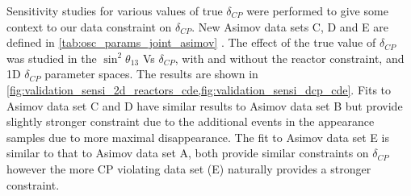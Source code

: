 \clearpage

Sensitivity studies for various values of true $\delta_{CP}$ were performed to give some context to our data constraint on $\delta_{CP}$. New Asimov data sets C, D and E are defined in \cref{tab:osc_params_joint_asimov} .
The effect of the true value of $\delta_{CP}$ was studied in the $\sin^2 \theta_{13}$ Vs $\delta_{CP}$, with and without the reactor constraint, and 1D $\delta_{CP}$ parameter spaces. The results are shown in \cref{fig:validation_sensi_2d_reactors_cde,fig:validation_sensi_dcp_cde}. Fits to Asimov data set C and D have similar results 
to Asimov data set B but provide slightly stronger constraint due to the additional events in the appearance samples due to more maximal disappearance. The fit to Asimov data set E is similar to that to Asimov data set A, both provide similar constraints on $\delta_{CP}$ however the more CP violating data set (E) naturally provides a stronger constraint.

